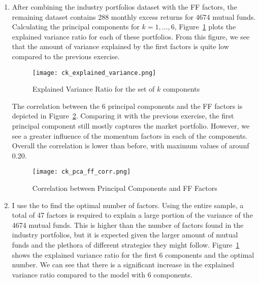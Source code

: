 \begin{solution}
    \begin{enumerate}[label = \Alph*)]
        \item After combining the industry portfolios dataset with the FF factors, the remaining dataset contains 288 monthly excess returns for 4674 mutual funds. Calculating the principal components for \(k = 1, \dots, 6\), Figure~\ref{fig:ck_explained_var} plots the explained variance ratio for each of these portfolios. From this figure, we see that the amount of variance explained by the first factors is quite low compared to the previous exercise. 
        \begin{figure}[!htbp]
            \begin{small}
                \begin{center}
                    \texttt{[image: ck\_explained\_variance.png]}
                \end{center}
                \caption{Explained Variance Ratio for the set of \(k\) components}
                \label{fig:ck_explained_var}
            \end{small}
        \end{figure}
        The correlation between the 6 principal components and the FF factors is depicted in Figure~\ref{fig:ck_pca_ff}. Comparing it with the previous exercise, the first principal component still mostly captures the market portfolio. However, we see a greater influence of the momentum factors in each of the components. Overall the correlation is lower than before, with maximum values of arounf 0.20.
        \begin{figure}[!htbp]
            \begin{small}
                \begin{center}
                    \texttt{[image: ck\_pca\_ff\_corr.png]}
                \end{center}
                \caption{Correlation between Principal Components and FF Factors}
                \label{fig:ck_pca_ff}
            \end{small}
        \end{figure}
        
    \item I use the \citet{connor1993test} to find the optimal number of factors. Using the entire sample, a total of 47 factors is required to explain a large portion of the variance of the 4674 mutual funds. This is higher than the number of factors found in the industry portfolios, but it is expected given the larger amount of mutual funds and the plethora of different strategies they might follow. Figure~\ref{fig:ck_explained_var} shows the explained variance ratio for the first 6 components and the optimal number. We can see that there is a significant increase in the explained variance ratio compared to the model with 6 components.
    

\end{enumerate}
\end{solution}
